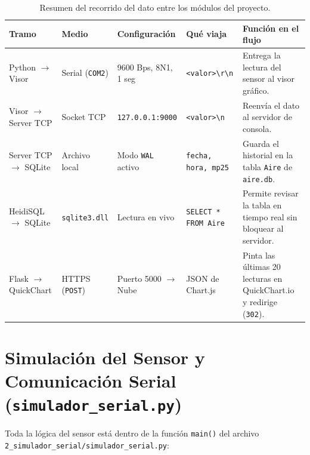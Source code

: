 \documentclass[11pt,a4paper]{article}
\begin{document}
\begin{table}[H]
\centering
\small
\begin{tabular}{@{}llllp{5.3cm}@{}}
\toprule
\textbf{Tramo} & \textbf{Medio} & \textbf{Configuración} & \textbf{Qué viaja} & \textbf{Función en el flujo} \\ \midrule
Python $\rightarrow$ Visor & Serial (\texttt{COM2}) & 9600 Bps, 8N1, 1 seg & \texttt{<valor>\textbackslash r\textbackslash n} & Entrega la lectura del sensor al visor gráfico. \\ \addlinespace
Visor $\rightarrow$ Server TCP & Socket TCP & \texttt{127.0.0.1:9000} & \texttt{<valor>\textbackslash n} & Reenvía el dato al servidor de consola. \\ \addlinespace
Server TCP $\rightarrow$ SQLite & Archivo local & Modo \texttt{WAL} activo & \texttt{fecha, hora, mp25} & Guarda el historial en la tabla \texttt{Aire} de \texttt{aire.db}. \\ \addlinespace
HeidiSQL $\rightarrow$ SQLite & \texttt{sqlite3.dll} & Lectura en vivo & \texttt{SELECT * FROM Aire} & Permite revisar la tabla en tiempo real sin bloquear al servidor. \\ \addlinespace
Flask $\rightarrow$ QuickChart & HTTPS (\texttt{POST}) & Puerto 5000 $\rightarrow$ Nube & JSON de Chart.js & Pinta las últimas 20 lecturas en QuickChart.io y redirige (\texttt{302}). \\ \bottomrule
\end{tabular}
\caption{Resumen del recorrido del dato entre los módulos del proyecto.}
\end{table}

\section{Simulación del Sensor y Comunicación Serial (\texttt{simulador\_serial.py})}

Toda la lógica del sensor está dentro de la función \texttt{main()} del archivo \texttt{2\_simulador\_serial/simulador\_serial.py}:
\end{document}
